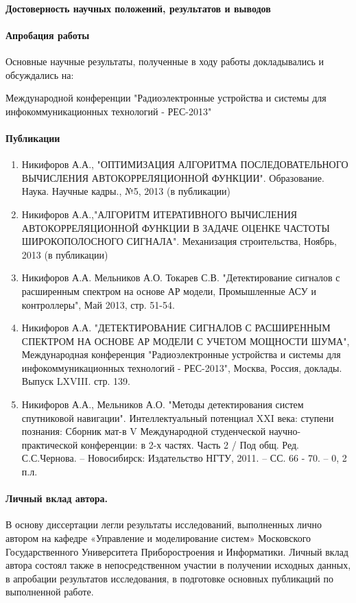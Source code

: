\paragraph{Достоверность научных положений, результатов и выводов}

\paragraph{Апробация работы}
Основные научные результаты, полученные в ходу работы докладывались и обсуждались на:

Международной конференции "Радиоэлектронные устройства и системы для инфокоммуникационных технологий - РЕС-2013"

\paragraph{Публикации}
\begin{enumerate}
	\item Никифоров А.А., "ОПТИМИЗАЦИЯ АЛГОРИТМА ПОСЛЕДОВАТЕЛЬНОГО ВЫЧИСЛЕНИЯ АВТОКОРРЕЛЯЦИОННОЙ ФУНКЦИИ".
		Образование. Наука. Научные кадры., №5, 2013 (в публикации)
	\item Никифоров А.А.,"АЛГОРИТМ ИТЕРАТИВНОГО ВЫЧИСЛЕНИЯ АВТОКОРРЕЛЯЦИОННОЙ ФУНКЦИИ В ЗАДАЧЕ ОЦЕНКЕ ЧАСТОТЫ ШИРОКОПОЛОСНОГО СИГНАЛА".
		Механизация строительства, Ноябрь, 2013 (в публикации)
	\item Никифоров А.А. Мельников А.О. Токарев С.В. "Детектирование сигналов с расширенным спектром на основе АР модели, Промышленные АСУ и контроллеры", Май 2013, стр. 51-54.
	\item Никифоров А.А. "ДЕТЕКТИРОВАНИЕ СИГНАЛОВ С РАСШИРЕННЫМ СПЕКТРОМ НА ОСНОВЕ АР МОДЕЛИ С УЧЕТОМ МОЩНОСТИ ШУМА", Международная конференция
		"Радиоэлектронные устройства и системы для инфокоммуникационных технологий - РЕС-2013", Москва, Россия, доклады. Выпуск LXVIII. стр. 139.
	\item Никифоров А.А., Мельников А.О. "Методы детектирования систем спутниковой навигации". Интеллектуальный потенциал XXI века: ступени познания:
		Сборник мат-в V Международной студенческой научно-практической конференции: в 2-х частях. Часть 2 / Под общ. Ред. С.С.Чернова. – Новосибирск:
		Издательство НГТУ, 2011. – СС. 66 - 70. – 0, 2 п.л.
\end{enumerate}

\paragraph{Личный вклад автора.}
В основу диссертации легли результаты исследований, выполненных лично автором на кафедре «Управление и моделирование систем» Московского Государственного
Университета Приборостроения и Информатики. Личный вклад автора состоял также в непосредственном участии в получении исходных данных, в апробации результатов исследования,
в подготовке основных публикаций по выполненной работе.

